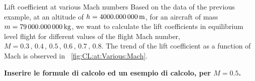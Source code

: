 \documentclass[[12pt,twoside]{book}
\begin{document}
%

%
\begin{myExampleX}{Lift coefficient at various Mach numbers}{}%
\label{example:Lift:Coefficient:At:Various:Mach}
%
\noindent
Based on the data of the previous example, at an altitude of $h=\SI[round-precision=0]{\myAltitudeM}{m}$, for an aircraft of mass $m=\SI[round-precision=0]{\myMassKg}{kg}$, we want to calculate the lift coefficients in equilibrium level flight for different values of the flight Mach number, $M = 0.3\,,\, 0.4\,,\, 0.5\,,\, 0.6\,,\, 0.7\,,\, 0.8$. The trend of the lift coefficient as a function of Mach is observed in \figurename~\vref{fig:CL:at:Various:Mach}.

\medskip
\noindent
{\color{red} \bf Inserire le formule di calcolo ed un esempio di calcolo, per $M=0.5$.}

\myTableDataset



\end{myExampleX}
\end{document}
